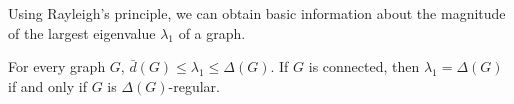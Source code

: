     

Using Rayleigh's principle, we can obtain basic information about the magnitude of the largest eigenvalue $\lambda_1$ of a graph.
\begin{proposition}
    For every graph $G$, $\bar{d} (G) \le \lambda_1 \le \Delta(G)$.
    If $G$ is connected, then $\lambda_1 = \Delta(G)$ if and only if $G$ is $\Delta(G)$-regular.
\end{proposition}

